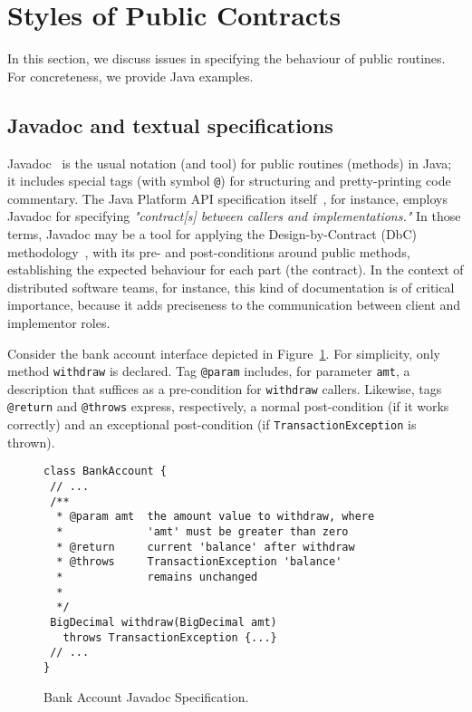 \section{Styles of Public Contracts}
\label{sec:example}

In this section, we discuss issues in specifying the behaviour of public routines. For concreteness, we provide Java examples.

\subsection{Javadoc and textual specifications}

Javadoc~\cite{javadoc-oracle} is the usual notation (and tool) for public routines (methods) in Java; it includes special tags (with symbol \texttt{@}) for structuring and pretty-printing code commentary.
The Java Platform API specification itself~\cite{java-spec}, for instance, employs Javadoc for specifying \emph{"contract[s] between callers and implementations."}
In those terms, Javadoc may be a tool for applying the Design-by-Contract (DbC) methodology~\cite{dbc}, with its pre- and post-conditions around public methods, establishing the expected behaviour for each part (the contract). In the context of distributed software teams, for instance, this kind of documentation is of critical importance, because it adds preciseness to the communication between client and implementor roles. 


Consider the bank account interface depicted in Figure~\ref{Fig-Javadoc-Bank}. For simplicity, only method {\lstinline!withdraw!} is declared. Tag \lstinline!@param! includes, for parameter \lstinline!amt!, a description that suffices as a pre-condition for \lstinline!withdraw! callers. Likewise, tags \lstinline!@return! and \lstinline!@throws! express, respectively, a normal post-condition (if it works correctly) and an exceptional post-condition (if \lstinline!TransactionException! is thrown).


\begin{figure}
\centering
\begin{lstlisting}[basicstyle=\footnotesize\ttfamily,name=figxpi]
class BankAccount {
 // ...
 /**
  * @param amt  the amount value to withdraw, where
  *             'amt' must be greater than zero 
  * @return     current 'balance' after withdraw
  * @throws     TransactionException 'balance' 
  *             remains unchanged
  *
  */
 BigDecimal withdraw(BigDecimal amt) 
   throws TransactionException {...}
 // ...
}
\end{lstlisting}
\caption{Bank Account Javadoc Specification.}
\label{Fig-Javadoc-Bank}
\end{figure}


